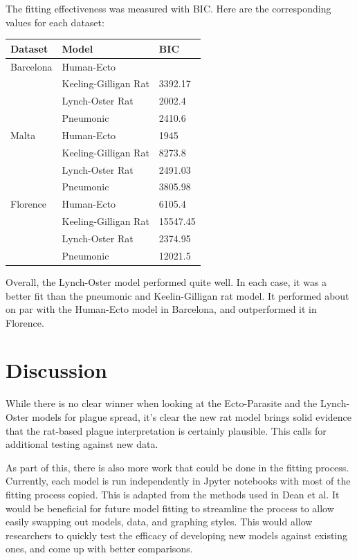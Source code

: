 \documentclass [letterpaper, 12pt] {article}
\begin{document}
The fitting effectiveness was measured with BIC. Here are the corresponding values for each dataset:

\begin{table}[H]
\begin{tabular}{|l|l|l|}
\hline
\textbf{Dataset} & \textbf{Model}       & \textbf{BIC} \\ \hline
Barcelona        & Human-Ecto           &              \\ \cline{2-3} 
                 & Keeling-Gilligan Rat & 3392.17      \\ \cline{2-3} 
                 & Lynch-Oster Rat      & 2002.4       \\ \cline{2-3} 
                 & Pneumonic            & 2410.6       \\ \hline
Malta            & Human-Ecto           & 1945         \\ \cline{2-3} 
                 & Keeling-Gilligan Rat & 8273.8       \\ \cline{2-3} 
                 & Lynch-Oster Rat      & 2491.03      \\ \cline{2-3} 
                 & Pneumonic            & 3805.98      \\ \hline
Florence         & Human-Ecto           & 6105.4       \\ \cline{2-3} 
                 & Keeling-Gilligan Rat & 15547.45     \\ \cline{2-3} 
                 & Lynch-Oster Rat      & 2374.95      \\ \cline{2-3} 
                 & Pneumonic            & 12021.5      \\ \hline
\end{tabular}
\end{table}


Overall, the Lynch-Oster model performed quite well. In each case, it was a better fit than the pneumonic and Keelin-Gilligan rat model. It performed about on par with the Human-Ecto model in Barcelona, and outperformed it in Florence.

\newpage

\section {Discussion}

While there is no clear winner when looking at the Ecto-Parasite and the Lynch-Oster models for plague spread, it's clear the new rat model brings solid evidence that the rat-based plague interpretation is certainly plausible. This calls for additional testing against new data.

As part of this, there is also more work that could be done in the fitting process. Currently, each model is run independently in Jpyter notebooks with most of the fitting process copied. This is adapted from the methods used in Dean et al. It would be beneficial for future model fitting to streamline the process to allow easily swapping out models, data, and graphing styles. This would allow researchers to quickly test the efficacy of developing new models against existing ones, and come up with better comparisons.


\pagebreak



\end{document}

